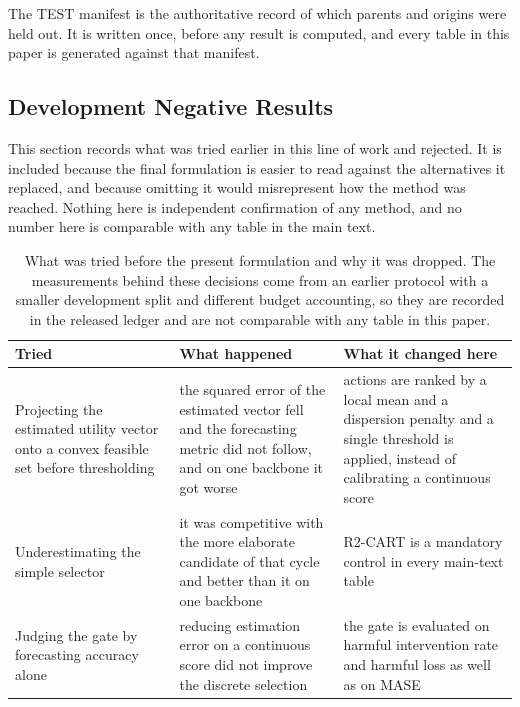 \documentclass{article}
\begin{document}
The TEST manifest is the authoritative record of which parents and origins were held out. It
is written once, before any result is computed, and every table in this paper is generated
against that manifest.

\subsection{Development Negative Results}
\label{app:development}
This section records what was tried earlier in this line of work and rejected. It is included
because the final formulation is easier to read against the alternatives it replaced, and
because omitting it would misrepresent how the method was reached. Nothing here is independent
confirmation of any method, and no number here is comparable with any table in the main text.

\begin{table}[htbp]
  \caption{What was tried before the present formulation and why it was dropped. The
  measurements behind these decisions come from an earlier protocol with a smaller development
  split and different budget accounting, so they are recorded in the released ledger and are
  not comparable with any table in this paper.}
  \label{tab:app-development}
  \centering
  \small
  \setlength{\tabcolsep}{4pt}
\begin{tabular}{@{}p{} p{} p{}@{}}
    \toprule
    Tried & What happened & What it changed here \\
    \midrule
    Projecting the estimated utility vector onto a convex feasible set before thresholding & the squared error of the estimated vector fell and the forecasting metric did not follow, and on one backbone it got worse & actions are ranked by a local mean and a dispersion penalty and a single threshold is applied, instead of calibrating a continuous score \\
    Underestimating the simple selector & it was competitive with the more elaborate candidate of that cycle and better than it on one backbone & R2-CART is a mandatory control in every main-text table \\
    Judging the gate by forecasting accuracy alone & reducing estimation error on a continuous score did not improve the discrete selection & the gate is evaluated on harmful intervention rate and harmful loss as well as on MASE \\
    \bottomrule
  \end{tabular}
\end{table}
\end{document}
